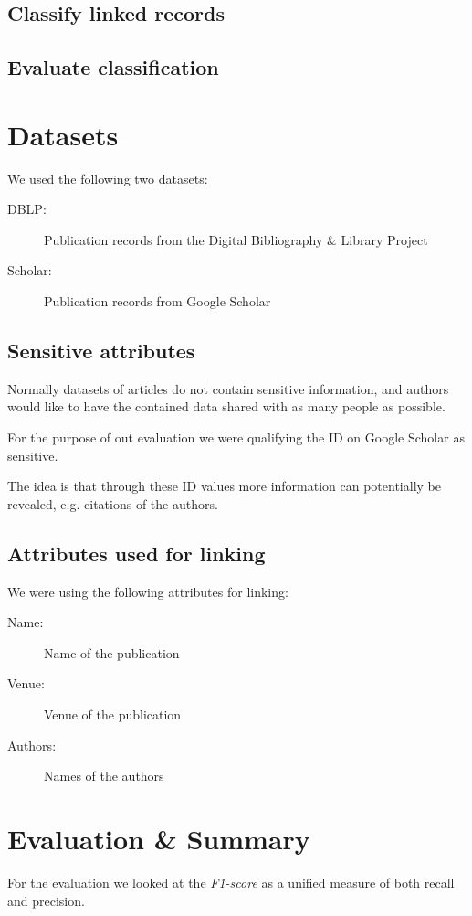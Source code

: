 \documentclass[sigconf,nonacm]{acmart}
\begin{document}
\subsection{Classify linked records}

\subsection{Evaluate classification}

\section{Datasets}

We used the following two datasets:
\begin{description}
\item[DBLP:] Publication records from the Digital Bibliography \& Library Project
\item[Scholar:] Publication records from Google Scholar
\end{description}

\subsection{Sensitive attributes}

Normally datasets of articles do not contain sensitive information,
and authors would like to have the contained data shared with
as many people as possible.

For the purpose of out evaluation we were qualifying the
ID on Google Scholar as sensitive.

The idea is that through these ID values more information
can potentially be revealed, e.g. citations of the authors.

\subsection{Attributes used for linking}

We were using the following attributes for linking:
\begin{description}
\item[Name:] Name of the publication
\item[Venue:] Venue of the publication
\item[Authors:] Names of the authors
\end{description}

\section{Evaluation \& Summary}

For the evaluation we looked at the \emph{F1-score} as a unified
measure of both recall and precision.



\end{document}
